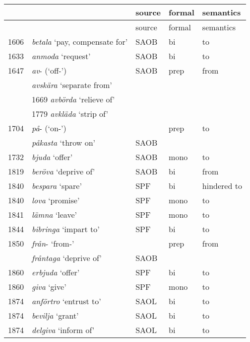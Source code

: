 \documentclass[output=paper]{langscibook}
\begin{document}
\begin{longtable}{ll lll}
\lsptoprule & & source & formal  & semantics\\\midrule\endfirsthead\midrule & & source & formal  & semantics\\\midrule\endhead\endfoot\lspbottomrule\endlastfoot

1606 & \textit{betala} ‘pay, compensate for’ &     SAOB & bi   & to\\
1633 & \textit{anmoda} `request'             & SAOB  & bi & to\\
1647 & \textit{av}{}- (‘off-’)               &     SAOB & prep & from\\
     & \textit{avskära} ‘separate from’      &          &\\
     & 1669 \textit{avbörda} ‘relieve of’    &          &\\
     & 1779 \textit{avkläda} ‘strip of’      &          &\\
1704 & \textit{på}{}- (‘on-’)                &          & prep  & to\\
     & \textit{påkasta} ‘throw on’           &     SAOB &\\
1732 & \textit{bjuda} ‘offer’                &     SAOB & mono &  to\\
1819 & \textit{beröva} ‘deprive of’          &     SAOB & bi  & from\\
1840 & \textit{bespara} ‘spare’              &      SPF & bi  & hindered to\\
1840 & \textit{lova} ‘promise’               &      SPF & mono & to\\
1841 & \textit{lämna} ‘leave’                &      SPF & mono & to\\
1844 & \textit{bibringa} ‘impart to’         &      SPF & bi   & to\\
1850 & \textit{från}{}- ‘from-’              &          & prep & from\\
     & \textit{fråntaga} ‘deprive of’        &     SAOB &\\
1860 & \textit{erbjuda} ‘offer’              &     SPF  & bi   & to\\
1860 & \textit{giva} ‘give’                  &      SPF & mono & to\\
1874 & \textit{anförtro} ‘entrust to’        &     SAOL & bi   & to\\
1874 & \textit{bevilja} ‘grant’              &     SAOL & bi   & to\\
1874 & \textit{delgiva} ‘inform of’          &     SAOL & bi   & to\\

\end{longtable}
\end{document}
